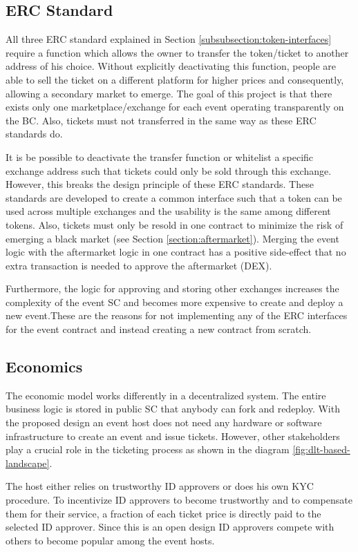 \subsection{ERC Standard}
All three ERC standard explained in Section \ref{subsubsection:token-interfaces} require a function which allows the owner to transfer the token/ticket to another address of his choice. Without explicitly deactivating this function, people are able to sell the ticket on a different platform for higher prices and consequently, allowing a secondary market to emerge. The goal of this project is that there exists only one marketplace/exchange for each event operating transparently on the BC. Also, tickets must not transferred in the same way as these ERC standards do.

It is be possible to deactivate the transfer function or whitelist a specific exchange address such that tickets could only be sold through this exchange. However, this breaks the design principle of these ERC standards. These standards are developed to create a common interface such that a token can be used across multiple exchanges and the usability is the same among different tokens. Also, tickets must only be resold in one contract to minimize the risk of emerging a black market (see Section \ref{section:aftermarket}). Merging the event logic with the aftermarket logic in one contract has a positive side-effect that no extra transaction is needed to approve the aftermarket (DEX). 

Furthermore, the logic for approving and storing other exchanges increases the complexity of the event SC and becomes more expensive to create and deploy a new event.These are the reasons for not implementing any of the ERC interfaces for the event contract and instead creating a new contract from scratch. 


\subsection{Economics}\label{design:economy}

The economic model works differently in a decentralized system. The entire business logic is stored in public SC that anybody can fork and redeploy. With the proposed design an event host does not need any hardware or software infrastructure to create an event and issue tickets. However, other stakeholders play a crucial role in the ticketing process as shown in the diagram \ref{fig:dlt-based-landscape}.

The host either relies on trustworthy ID approvers or does his own KYC procedure. To incentivize ID approvers to become trustworthy and to compensate them for their service, a fraction of each ticket price is directly paid to the selected ID approver. Since this is an open design ID approvers compete with others to become popular among the event hosts.

